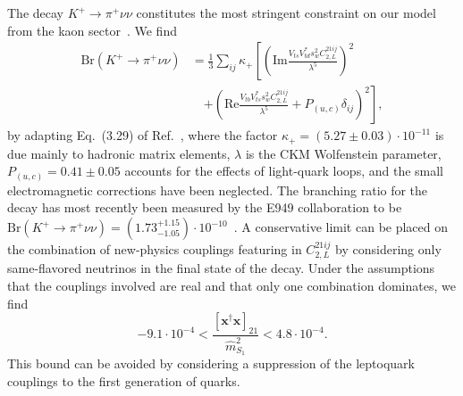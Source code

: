 The decay $K^+ \rightarrow \pi^+ \nu \nu$ constitutes the most stringent
constraint on our model from the kaon sector~\cite{Kumar:2016omp}. We
find
\begin{equation}
  \begin{split}
  \text{Br}(K^+\rightarrow \pi^+ \nu \nu) &= \frac{1}{3}\sum_{ij} \kappa_+ \left[ \left(\text{Im} \frac{ V_{ts}V_{td}^* s_w^2 C_{2,L}^{21ij} }{\lambda^5} \right)^2  \right. \\ &\quad \left. +  \left( \text{Re} \frac{ V_{tb}V_{ts}^* s_w^2 C_{2,L}^{21ij}}{\lambda^5} + P_{(u,c)} \delta_{ij} \right)^2 \right],
  \end{split}
\end{equation}
by adapting Eq.~(3.29) of Ref.~\cite{Altmannshofer:2009ma}, where the
factor $\kappa_+ = (5.27 \pm 0.03) \cdot 10^{-11}$ is due mainly to hadronic
matrix elements, $\lambda$ is the CKM Wolfenstein parameter, $P_{(u,c)} = 0.41
\pm 0.05$ accounts for the effects of light-quark loops, and the small
electromagnetic corrections have been neglected. The branching ratio for the
decay has most recently been measured by the E949 collaboration to be
$\text{Br}(K^+ \rightarrow \pi^+ \nu \nu) = (1.73^{+1.15}_{-1.05}) \cdot
10^{-10}$~\cite{Artamonov:2009sz}. A conservative limit can be placed on the
combination of new-physics couplings featuring in $C_{2,L}^{21ij}$ by
considering only same-flavored neutrinos in the final state of the decay. Under
the assumptions that the couplings involved are real and that only one
combination dominates, we find
\begin{equation} \label{eq:ch3-kpinunubound}
  -9.1 \cdot 10^{-4} < \frac{[\mathbf{x}^\dagger \mathbf{x}]_{21}}{\hat{m}_{S_{1}}^2} < 4.8 \cdot 10^{-4}.
\end{equation}
This bound can be avoided by considering a suppression of the leptoquark
couplings to the first generation of quarks.

